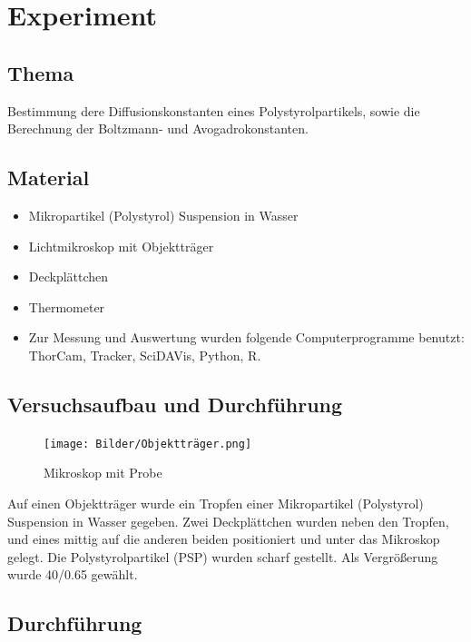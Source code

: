 \documentclass[
  9pt,
]{article}
\begin{document}
\hypertarget{experiment}{%
\section{Experiment}\label{experiment}}

\hypertarget{thema}{%
\subsection{Thema}\label{thema}}

Bestimmung dere Diffusionskonstanten eines Polystyrolpartikels, sowie
die Berechnung der Boltzmann- und Avogadrokonstanten.

\hypertarget{material}{%
\subsection{Material}\label{material}}

\begin{itemize}
\item{Mikropartikel (Polystyrol) Suspension in Wasser}
\item{Lichtmikroskop mit Objektträger}
\item{Deckplättchen}
\item{Thermometer}
\item{Zur Messung und Auswertung wurden folgende Computerprogramme benutzt: ThorCam, Tracker, SciDAVis, Python, R.}
\end{itemize}

\hypertarget{versuchsaufbau-und-durchfuxfchrung}{%
\subsection{Versuchsaufbau und
Durchführung}\label{versuchsaufbau-und-durchfuxfchrung}}

\begin{figure}
\centering
\texttt{[image: Bilder/Objektträger.png]}
\caption{Mikroskop mit Probe}
\end{figure}

Auf einen Objektträger wurde ein Tropfen einer Mikropartikel
(Polystyrol) Suspension in Wasser gegeben. Zwei Deckplättchen wurden
neben den Tropfen, und eines mittig auf die anderen beiden positioniert
und unter das Mikroskop gelegt. Die Polystyrolpartikel (PSP) wurden
scharf gestellt. Als Vergrößerung wurde 40/0.65 gewählt.

\hypertarget{durchfuxfchrung}{%
\subsection{Durchführung}\label{durchfuxfchrung}}
\end{document}
